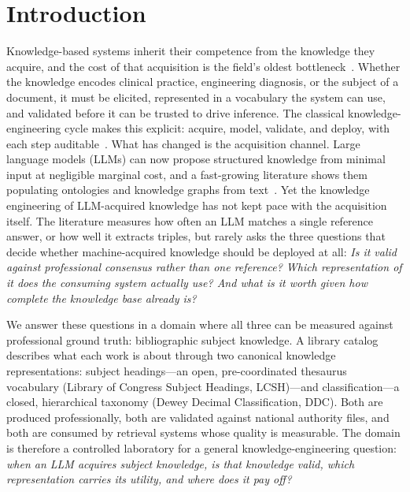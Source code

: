 
\section{Introduction}
\label{sec:intro}

Knowledge-based systems inherit their competence from the knowledge they
acquire, and the cost of that acquisition is the field's oldest
bottleneck~\cite{feigenbaum_knowledge_engineering}. Whether the knowledge
encodes clinical practice, engineering diagnosis, or the subject of a
document, it must be elicited, represented in a vocabulary the system can
use, and validated before it can be trusted to drive inference. The
classical knowledge-engineering cycle makes this explicit: acquire, model,
validate, and deploy, with each step auditable~\cite{studer_knowledge_engineering}.
What has changed is the acquisition channel. Large language models (LLMs)
can now propose structured knowledge from minimal input at negligible
marginal cost, and a fast-growing literature shows them populating
ontologies and knowledge graphs from text~\cite{ciatto_llm_oracle_kbs,
pan_llm_kg_roadmap, ji_kg_survey, xu_llm_gen_ie}. Yet the knowledge
engineering of LLM-acquired knowledge has not kept pace with the acquisition
itself. The literature measures how often an LLM matches a single reference
answer, or how well it extracts triples, but rarely asks the three questions
that decide whether machine-acquired knowledge should be deployed at all:
\textit{Is it valid against professional consensus rather than one
reference? Which representation of it does the consuming system actually
use? And what is it worth given how complete the knowledge base already
is?}

We answer these questions in a domain where all three can be measured
against professional ground truth: bibliographic subject knowledge. A library
catalog describes what each work is about through two canonical knowledge
representations: subject headings---an open, pre-coordinated thesaurus
vocabulary (Library of Congress Subject Headings, LCSH)---and
classification---a closed, hierarchical taxonomy (Dewey Decimal
Classification, DDC). Both are produced professionally, both are validated
against national authority files, and both are consumed by retrieval systems
whose quality is measurable. The domain is therefore a controlled laboratory
for a general knowledge-engineering question: \emph{when an LLM acquires
subject knowledge, is that knowledge valid, which representation carries its
utility, and where does it pay off?}

